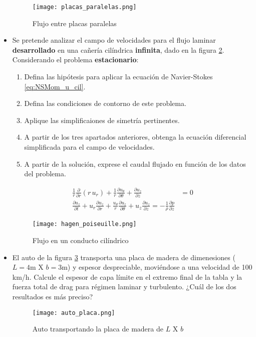 \begin{itemize}
\begin{figure}[h!!]
\centering
\texttt{[image: placas\_paralelas.png]}
\caption{Flujo entre placas paralelas}
\label{fig:placas_paralelas}
\end{figure}

\item Se pretende analizar el campo de velocidades para el flujo laminar \textbf{desarrollado} en una cañería cilíndrica \textbf{infinita}, dado en la figura \ref{fig:hagen_poiseuille}. Considerando el problema \textbf{estacionario}:
\begin{enumerate}
  \item Defina las hipótesis para aplicar la ecuación de Navier-Stokes \ref{eq:NSMom_u_cil}.
  \item Defina las condiciones de contorno de este problema.
  \item Aplique las simplificaiones de simetría pertinentes.
  \item A partir de los tres apartados anteriores, obtenga la ecuación diferencial simplificada para el campo de velocidades.
  \item A partir de la solución, exprese el caudal flujado en función de los datos del problema.
\end{enumerate}

\begin{equation}\label{eq:NSMom_u_cil}
\begin{aligned}
\frac{1}{r}\frac{\partial }{\partial r} (r\,u_r)+ \frac{1}{r}\frac{\partial u_\theta}{\partial \theta} + \frac{\partial u_z}{\partial z}
&= 0 
\\
\frac{\partial u_z}{\partial t} + u_r\frac{\partial u_z}{\partial r} + \frac{u_\theta}{r}\frac{\partial u_z}{\partial \theta} + u_z \frac{\partial u_z}{\partial z} = -\frac{1}{\rho}\frac{\partial p}{\partial z}
\end{aligned}
\end{equation}

\begin{figure}[h!!]
\centering
\texttt{[image: hagen\_poiseuille.png]}
\caption{Flujo en un conducto cilíndrico}
\label{fig:hagen_poiseuille}
\end{figure}

\item El auto de la figura \ref{fig:auto_placa} transporta una placa de madera de dimenesiones ($L = 4$m X $b =3$m) y espesor despreciable, moviéndose a una velocidad de 100 km/h. Calcule el espesor de capa límite en el extremo final de la tabla y la fuerza total de drag para régimen laminar y turbulento. ¿Cuál de los dos resultados es más preciso?
\begin{figure}[h!!]
\centering
\texttt{[image: auto\_placa.png]}
\caption{Auto transportando la placa de madera de $L$ X $b$}
\label{fig:auto_placa}
\end{figure}



\end{itemize}
